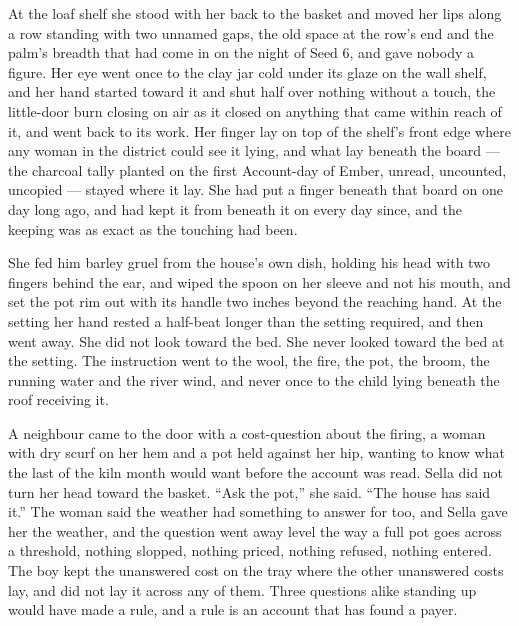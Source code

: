 At the loaf shelf she stood with her back to the basket and moved her lips along a row standing with two unnamed gaps, the old space at the row's end and the palm's breadth that had come in on the night of Seed 6, and gave nobody a figure. Her eye went once to the clay jar cold under its glaze on the wall shelf, and her hand started toward it and shut half over nothing without a touch, the little-door burn closing on air as it closed on anything that came within reach of it, and went back to its work. Her finger lay on top of the shelf's front edge where any woman in the district could see it lying, and what lay beneath the board --- the charcoal tally planted on the first Account-day of Ember, unread, uncounted, uncopied --- stayed where it lay. She had put a finger beneath that board on one day long ago, and had kept it from beneath it on every day since, and the keeping was as exact as the touching had been.

She fed him barley gruel from the house's own dish, holding his head with two fingers behind the ear, and wiped the spoon on her sleeve and not his mouth, and set the pot rim out with its handle two inches beyond the reaching hand. At the setting her hand rested a half-beat longer than the setting required, and then went away. She did not look toward the bed. She never looked toward the bed at the setting. The instruction went to the wool, the fire, the pot, the broom, the running water and the river wind, and never once to the child lying beneath the roof receiving it.

A neighbour came to the door with a cost-question about the firing, a woman with dry scurf on her hem and a pot held against her hip, wanting to know what the last of the kiln month would want before the account was read. Sella did not turn her head toward the basket. “Ask the pot,” she said. “The house has said it.” The woman said the weather had something to answer for too, and Sella gave her the weather, and the question went away level the way a full pot goes across a threshold, nothing slopped, nothing priced, nothing refused, nothing entered. The boy kept the unanswered cost on the tray where the other unanswered costs lay, and did not lay it across any of them. Three questions alike standing up would have made a rule, and a rule is an account that has found a payer.

\scenebreak

